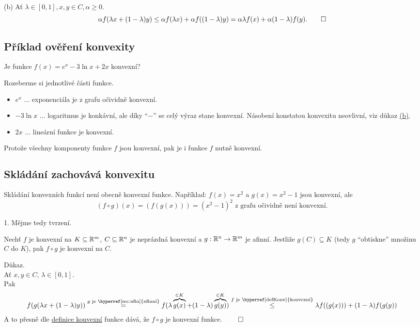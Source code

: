 (b) Ať $\lambda \in [0,1], x, y \in C, \alpha \geq 0$.
\[
    \alpha f(\lambda x + (1-\lambda)y) \leq \alpha f(\lambda x) + \alpha f((1-\lambda)y) = \alpha \lambda f(x) + 
    \alpha (1-\lambda)f(y). \qed
\]

\subsection{Příklad ověření konvexity}
Je funkce $f(x) = e^x - 3 \ln x + 2x$ konvexní?

Rozeberme si jednotlivé části funkce.
\begin{itemize}
    \item $e^x$ $\dots$ exponenciála je z grafu očividně konvexní.
    \item $-3 \ln x$ $\dots$ logaritmus je konkávní, ale díky \enquote{$\minus$} se celý výraz stane konvexní. Násobení
    konstatou konvexitu neovlivní, viz důkaz \hyperref[ssKonv]{(b)}.
    \item $2x$ $\dots$ lineární funkce je konvexní.
\end{itemize}
Protože všechny komponenty funkce $f$ jsou konvexní, pak je i funkce $f$ nutně konvexní.

\subsection{Skládání zachovává konvexitu}
Skládání konvexních funkcí není obecně konvexní funkce. Například: $f(x) = x^2$ a $g(x) = x^2 -1$ jsou konvexní, ale
\[
    (f \circ g)(x) = (f(g(x))) = (x^2 - 1)^2 \text{ z grafu očividně není konvexní.}
\]

1. Mějme tedy tvrzení.

Nechť $f$ je konvexní na $K \subseteq \mathbb{R}^m$, $C \subseteq \mathbb{R}^n$ je neprázdná konvexní a $g : \mathbb{R}^n \rightarrow \mathbb{R}^m$ je
afinní. Jestliže $g(C) \subseteq K$ (tedy $g$ \enquote{obtiskne} množinu $C$ do $K$), pak $f \circ g$ je konvexní na
$C$. \label{skladFun}

Důkaz.\\
Ať $x, y \in C$, $\lambda \in [0,1]$.\\
Pak
\[
    f(g(\lambda x + (1-\lambda)y))
    \stackrel{g \text{ je \hyperref[sec:afin]{afinní}}}{=} f(\lambda \overbrace{g(x)}^{\in K}
    + (1-\lambda) \overbrace{g(y)}^{\in K})
    \stackrel{f \text{ je \hyperref[defKonv]{konvexní}}}{\leq} \lambda f((g(x))) + (1-\lambda) f(g(y))
\]
A to přesně dle \hyperref[defKonv]{definice konvexní} funkce dává, že $f \circ g$ je konvexní funkce. $\qed$

